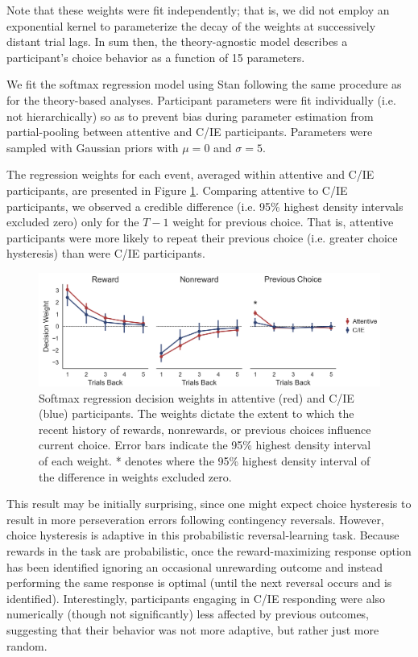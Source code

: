 \documentclass[a4paper,notitlepage,12pt]{article}
\begin{document}
\begin{refsection}[supp]
Note that these weights were fit independently; that is, we did not employ an exponential kernel to parameterize the decay of the weights at successively distant trial lags. In sum then, the theory-agnostic model describes a participant's choice behavior as a function of 15 parameters. 

We fit the softmax regression model using Stan following the same procedure as for the theory-based analyses. Participant parameters were fit individually (i.e. not hierarchically)  so as to prevent bias during parameter estimation from partial-pooling between attentive and C/IE participants. Parameters were sampled with Gaussian priors with $\mu = 0$ and $\sigma = 5$.

The regression weights for each event, averaged within attentive and C/IE participants, are presented in Figure \ref{fig:regression}. Comparing attentive to C/IE participants, we observed a credible difference (i.e. 95\% highest density intervals excluded zero) only for the $T-1$ weight for previous choice. That is, attentive participants were more likely to repeat their previous choice (i.e. greater choice hysteresis) than were C/IE participants.

\begin{figure}[!t]
\includegraphics[width=16cm]{../figures/main_03c.png}
\centering
\captionsetup{width=0.88\textwidth}
\caption{Softmax regression decision weights in attentive (red) and C/IE (blue) participants. The weights dictate the extent to which the recent history of rewards, nonrewards, or previous choices influence current choice. Error bars indicate the 95\% highest density interval of each weight. * denotes where the 95\% highest density interval of the difference in weights excluded zero.}
\label{fig:regression}
\end{figure}

This result may be initially surprising, since one might expect choice hysteresis to result in more perseveration errors following contingency reversals. However, choice hysteresis is adaptive in this probabilistic reversal-learning task. Because rewards in the task are probabilistic, once the reward-maximizing response option has been identified ignoring an occasional unrewarding outcome and instead performing the same response is optimal (until the next reversal occurs and is identified). Interestingly, participants engaging in C/IE responding were also numerically (though not significantly) less affected by previous outcomes, suggesting that their behavior was not more adaptive, but rather just more random.


\end{refsection}
\end{document}
